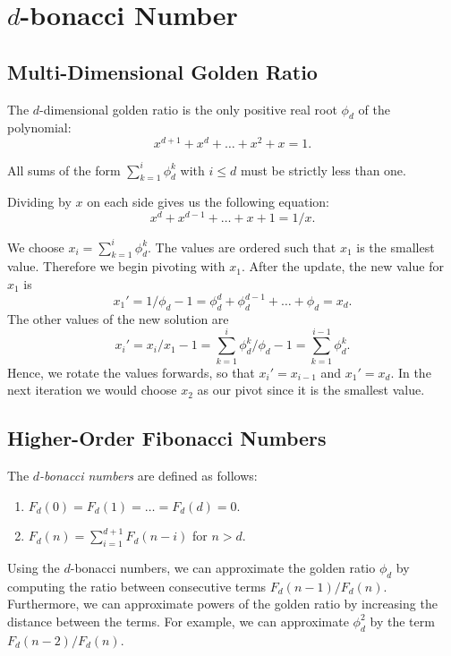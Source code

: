 \documentclass[english,version-2020-11]{uzl-thesis}
\begin{document}
\chapter{$d$-bonacci Number}

\section{Multi-Dimensional Golden Ratio}

\begin{definition}
  The $d$-dimensional golden ratio is the only positive real root $\phi_d$ of the polynomial:
  \[
    x^{d+1} + x^d + \dots + x^2 + x = 1.
  \]
\end{definition}

All sums of the form $\sum_{k=1}^i \phi_d^k$ with $i \le d$ must be strictly less than one.

Dividing by $x$ on each side gives us the following equation:
\[
  x^d + x^{d-1} + \dots + x + 1 = 1/x.
\]

We choose $x_i = \sum_{k = 1}^i \phi_d^k$.
The values are ordered such that $x_1$ is the smallest value.
Therefore we begin pivoting with $x_1$.
After the update, the new value for $x_1$ is
\[
  x_1' = 1/\phi_d - 1 = \phi_d^d + \phi_d^{d-1} + \dots + \phi_d = x_d.
\]
The other values of the new solution are
\[
  x_i' = x_i / x_1 - 1 = \sum_{k = 1}^i \phi_d^k / \phi_d - 1 = \sum_{k=1}^{i-1} \phi_d^k.
\]
Hence, we rotate the values forwards, so that $x_i' = x_{i-1}$ and $x_1' = x_d$.
In the next iteration we would choose $x_2$ as our pivot since it is the smallest value.

\section{Higher-Order Fibonacci Numbers}

\begin{definition}
  The \emph{$d$-bonacci numbers} are defined as follows:
  \begin{enumerate}
    \item $F_d(0) = F_d(1) = \dots = F_d(d) = 0$.
    \item $F_d(n) = \sum_{i = 1}^{d+1} F_d(n - i)$ for $n > d$.
  \end{enumerate}
\end{definition}

Using the $d$-bonacci numbers, we can approximate the golden ratio $\phi_d$
by computing the ratio between consecutive terms $F_d(n - 1) / F_d(n)$.
Furthermore, we can approximate powers of the golden ratio by increasing the distance between the terms.
For example, we can approximate $\phi_d^2$ by the term $F_d(n - 2) / F_d(n)$.
\end{document}
